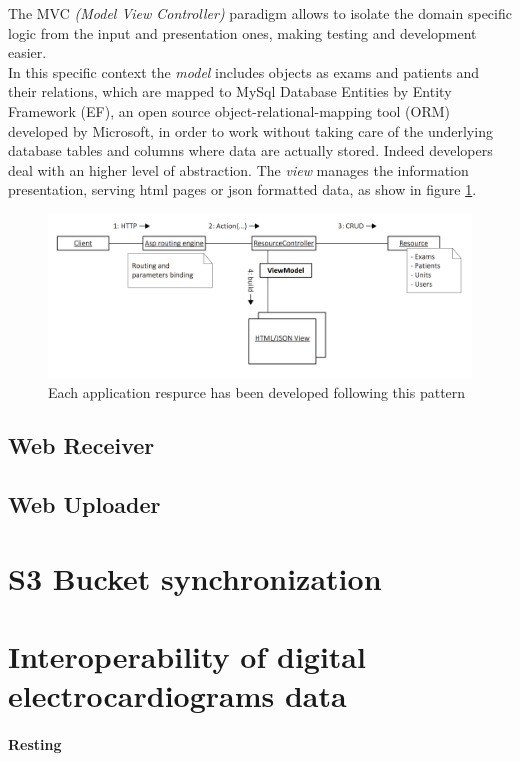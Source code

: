 The MVC \textit{(Model View Controller)} paradigm allows to isolate the domain specific logic from the input and presentation ones, making testing and development easier. \cite{mvc}\\
In this specific context the \textit{model} includes objects as exams and patients and their relations, which are mapped to MySql Database Entities by Entity Framework (EF), an open source object-relational-mapping tool (ORM) developed by Microsoft, in order to work without taking care of the underlying database tables and columns where data are actually stored. Indeed developers deal with an higher level of abstraction. \cite{wikipedia_ef}
The \textit{view} manages the information presentation, serving html pages or json formatted data, as show in figure \ref{fig:app_resource_pattern}.\\
\begin{figure}
    \includegraphics[width=\textwidth]{img/app_resource_pattern}
    \caption{Each application respurce has been developed following this pattern}
    \label{fig:app_resource_pattern}
\end{figure}

\subsection{Web Receiver}
\label{subsection:webreceiver}
\subsection{Web Uploader}
\section{S3 Bucket synchronization}
\section{Interoperability of digital electrocardiograms data}
\paragraph{Resting}
\label{paragraph:Resting}

